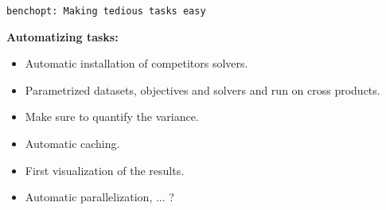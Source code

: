 \documentclass[unknownkeysallowed]{beamer}
\begin{document}
\begin{frame}{\texttt{benchopt: Making tedious tasks easy}}

    {\bf Automatizing tasks:}\\[1.2em]
    \begin{itemize}\itemsep.7em
        \item Automatic installation of competitors solvers.
        \item Parametrized datasets, objectives and solvers and run on cross products.
        \item Make sure to quantify the variance.
        \item Automatic caching.
        \item First visualization of the results.
        \item Automatic parallelization, ... ?
    \end{itemize}
\end{frame}
\end{document}
